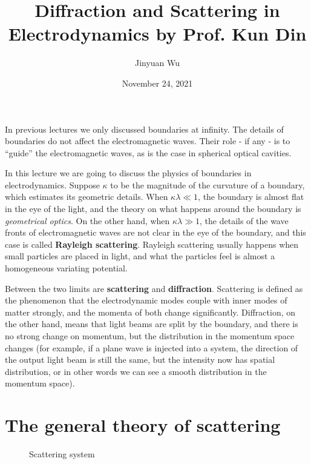 \documentclass[hyperref, a4paper]{article}
\title{Diffraction and Scattering in Electrodynamics by Prof. Kun Din}
\author{Jinyuan Wu}
\date{November 24, 2021}
\newcommand*{\concept}[1]{{\textbf{#1}}}
\begin{document}
\maketitle

In previous lectures we only discussed boundaries at infinity. The details of boundaries do not affect the 
electromagnetic waves. Their role - if any - is to ``guide'' the electromagnetic waves, as is the case in 
spherical optical cavities. 

In this lecture we are going to discuss the physics of boundaries in electrodynamics.
Suppose $\kappa$ to be the magnitude of the curvature of a boundary, which estimates its geometric details.
When $\kappa \lambda \ll 1$, the boundary is almost flat in the eye of the light, and the theory on 
what happens around the boundary is \emph{geometrical optics}. 
On the other hand, when $\kappa \lambda \gg 1$, the details of the wave fronts of electromagnetic waves 
are not clear in the eye of the boundary, and this case is called \concept{Rayleigh scattering}.
Rayleigh scattering usually happens when small particles are placed in light, and what the particles 
feel is almost a homogeneous variating potential. 

Between the two limits are \concept{scattering} and \concept{diffraction}. Scattering is defined as the 
phenomenon that the electrodynamic modes couple with inner modes of matter strongly, and the momenta of 
both change significantly. Diffraction, on the other hand, means that light beams are split by the boundary, and
there is no strong change on momentum, but the distribution in the momentum space changes (for example, if a
plane wave is injected into a system, the direction of the output light beam is still the same, but the intensity
now has spatial distribution, or in other words we can see a smooth distribution in the momentum space).

\section{The general theory of scattering}

\begin{figure}
    \centering
    
    \caption{Scattering system}
\end{figure}
\end{document}
